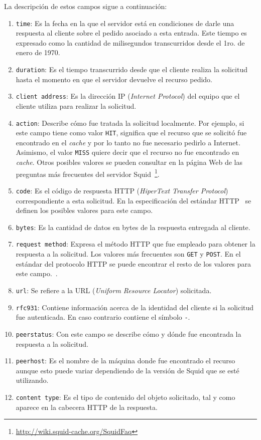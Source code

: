 La descripción de estos campos sigue a continuación\cite{Wessels2004}: 
\begin{enumerate}
 \item \verb+time+: Es la fecha en la que el servidor está en condiciones de
  darle una respuesta al cliente sobre el pedido asociado a esta entrada. Este
  tiempo es expresado como la cantidad de milisegundos transcurridos desde el 
  1ro. de enero de 1970.
 \item \verb+duration+: Es el tiempo transcurrido desde que el cliente realiza
  la solicitud hasta el momento en que el servidor devuelve el recurso pedido.
 \item \verb+client address+: Es la dirección IP (\textit{Internet Protocol})
  del equipo que el cliente utiliza para realizar la solicitud.
 \item \verb+action+: Describe cómo fue tratada la solicitud localmente. Por
  ejemplo, si este campo tiene como valor \texttt{HIT}, significa que el recurso
  que se solicitó fue encontrado en el \textit{cache} y por lo tanto no fue
  necesario pedirlo a Internet. Asimismo, el valor \texttt{MISS} quiere decir 
  que el recurso no fue encontrado en \textit{cache}. Otros posibles valores se 
  pueden consultar en la página Web de las preguntas más frecuentes del servidor
  Squid~\footnote{\url{http://wiki.squid-cache.org/SquidFaq}}.
 \item \verb+code+: Es el código de respuesta HTTP (\textit{HiperText Transfer
  Protocol}) correspondiente a esta solicitud. En la especificación del estándar
  HTTP~\cite{Fielding1999} se definen los posibles valores para este campo.
 \item \verb+bytes+: Es la cantidad de datos en bytes de la respuesta entregada
  al cliente.
 \item \verb+request method+: Expresa el método HTTP que fue empleado para
  obtener la respuesta a la solicitud. Los valores más frecuentes son 
  \texttt{GET} y \texttt{POST}. En el estándar del protocolo HTTP se puede 
  encontrar el resto de los valores para este campo.~\cite{Fielding1999}.
 \item \verb+url+: Se refiere a la URL (\textit{Uniform Resource Locator})
  solicitada.
 \item \verb+rfc931+: Contiene información acerca de la identidad del cliente 
  si la solicitud fue autenticada. En caso contrario contiene el símbolo 
  \texttt{-}.
 \item \verb+peerstatus+: Con este campo se describe cómo y dónde fue 
  encontrada la respuesta a la solicitud.
 \item \verb+peerhost+: Es el nombre de la máquina donde fue encontrado el
  recurso aunque esto puede variar dependiendo de la versión de Squid que se 
  esté utilizando.
 \item \verb+content type+: Es el tipo de contenido del objeto solicitado, tal 
  y como aparece en la cabecera HTTP de la respuesta.
\end{enumerate}


